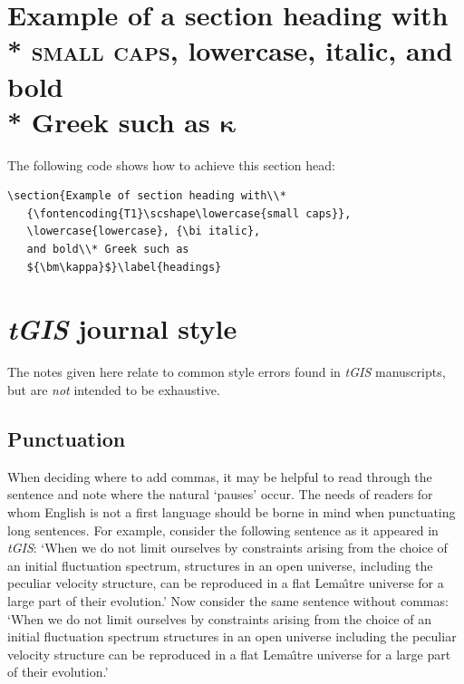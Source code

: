 \documentclass[]{tGIS2e}
\begin{document}
\section{Example of a section heading with\\*
   {\scshape\lowercase{small caps}},
   \lowercase{lowercase}, {\bi italic},
   and bold\\* Greek such as
   ${\bm\kappa}$}\label{headings}

%
The following code shows how to achieve this section head:
%
\begin{verbatim}
\section{Example of section heading with\\*
   {\fontencoding{T1}\scshape\lowercase{small caps}},
   \lowercase{lowercase}, {\bi italic},
   and bold\\* Greek such as
   ${\bm\kappa}$}\label{headings}
\end{verbatim}
%
%

\section{{\textit{tGIS}} journal style}

The notes given here relate to common style errors found in  {{\it tGIS}} manuscripts, but are {\itshape not\/}
intended to be exhaustive.

\subsection{Punctuation}

When  deciding  where to add commas, it may be  helpful  to  read through  the sentence and note where the
natural `pauses'  occur. The  needs  of readers for whom English is not a  first  language should  be  borne in
mind when punctuating  long  sentences.  For example, consider the following sentence as it appeared in {\it
tGIS}: `When we do not limit ourselves by constraints arising from the choice of an initial fluctuation spectrum,
structures in an open universe, including the peculiar velocity structure,  can be reproduced  in a flat
Lema\^{\i}tre universe for a large  part of their evolution.' Now consider the same sentence without commas:
`When  we do not limit ourselves by constraints arising from  the choice  of an initial fluctuation spectrum
structures in an  open universe including the peculiar velocity structure can be reproduced in  a  flat
Lema\^{\i}tre universe for a large  part of  their evolution.'
\end{document}
